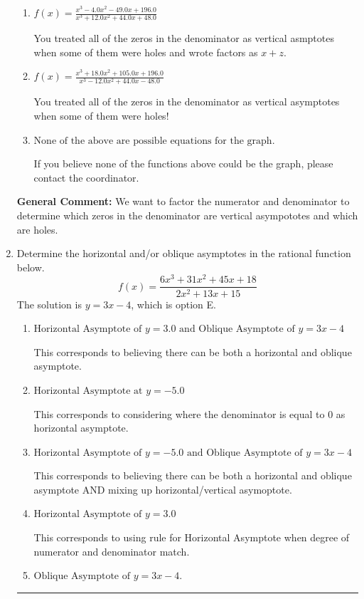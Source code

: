 \documentclass{extbook}[14pt]
\newcommand{\litem}[1]{\item #1

\rule{\textwidth}{0.4pt}}
\begin{document}
\begin{enumerate}
{\begin{enumerate}[label=\Alph*.]
Remember that factors are written as $x-z$. For example, the zero $x=2$ corresponds to the factor $x-(2)$.
\item \( f(x)=\frac{x^{3} -4.0 x^{2} -49.0 x + 196.0}{x^{3} +12.0 x^{2} +44.0 x + 48.0} \)

You treated all of the zeros in the denominator as vertical asmptotes when some of them were holes and wrote factors as $x+z$.
\item \( f(x)=\frac{x^{3} +18.0 x^{2} +105.0 x + 196.0}{x^{3} -12.0 x^{2} +44.0 x -48.0} \)

You treated all of the zeros in the denominator as vertical asymptotes when some of them were holes!
\item \( \text{None of the above are possible equations for the graph.} \)

If you believe none of the functions above could be the graph, please contact the coordinator.
\end{enumerate}

\textbf{General Comment:} We want to factor the numerator and denominator to determine which zeros in the denominator are vertical asympototes and which are holes.
}
\litem{
Determine the horizontal and/or oblique asymptotes in the rational function below.
\[ f(x) = \frac{6x^{3} +31 x^{2} +45 x + 18}{2x^{2} +13 x + 15} \]The solution is \( y = 3x -4 \), which is option E.\begin{enumerate}[label=\Alph*.]
\item \( \text{Horizontal Asymptote of } y = 3.0 \text{ and Oblique Asymptote of } y = 3x -4 \)

This corresponds to believing there can be both a horizontal and oblique asymptote.
\item \( \text{Horizontal Asymptote at } y = -5.0 \)

This corresponds to considering where the denominator is equal to 0 as horizontal asymptote.
\item \( \text{Horizontal Asymptote of } y = -5.0 \text{ and Oblique Asymptote of } y = 3x -4 \)

This corresponds to believing there can be both a horizontal and oblique asymptote AND mixing up horizontal/vertical asymoptote.
\item \( \text{Horizontal Asymptote of } y = 3.0  \)

This corresponds to using rule for Horizontal Asymptote when degree of numerator and denominator match.
\item \( \text{Oblique Asymptote of } y = 3x -4. \)


\end{enumerate}}
\end{enumerate}
\end{document}
